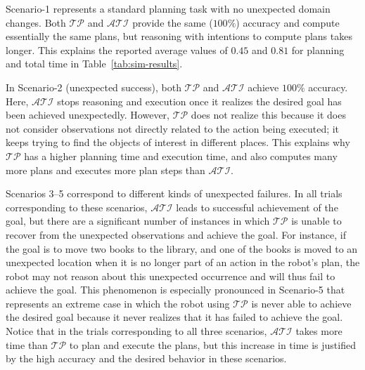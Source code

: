 \documentclass[letterpaper, 10 pt, conference]{ieeeconf}  %
\begin{document}
Scenario-1 represents a standard planning task with no unexpected
domain changes. Both $\mathcal{TP}$ and $\mathcal{ATI}$ provide the
same ($100\%$) accuracy and compute essentially the same plans, but
reasoning with intentions to compute plans takes longer. This explains
the reported average values of $0.45$ and $0.81$ for planning and
total time in Table~\ref{tab:sim-results}.

In Scenario-2 (unexpected success), both $\mathcal{TP}$ and
$\mathcal{ATI}$ achieve $100\%$ accuracy. Here, $\mathcal{ATI}$ stops
reasoning and execution once it realizes the desired goal has been
achieved unexpectedly. However, $\mathcal{TP}$ does not realize this
because it does not consider observations not directly related to the
action being executed; it keeps trying to find the objects of interest
in different places. This explains why $\mathcal{TP}$ has a higher
planning time and execution time, and also computes many more plans
and executes more plan steps than $\mathcal{ATI}$.

Scenarios 3--5 correspond to different kinds of unexpected failures.
In all trials corresponding to these scenarios, $\mathcal{ATI}$ leads
to successful achievement of the goal, but there are a significant
number of instances in which $\mathcal{TP}$ is unable to recover from
the unexpected observations and achieve the goal. For instance, if the
goal is to move two books to the library, and one of the books is
moved to an unexpected location when it is no longer part of an action
in the robot's plan, the robot may not reason about this unexpected
occurrence and will thus fail to achieve the goal. This phenomenon is
especially pronounced in Scenario-5 that represents an extreme case in
which the robot using $\mathcal{TP}$ is never able to achieve the
desired goal because it never realizes that it has failed to achieve
the goal. Notice that in the trials corresponding to all three
scenarios, $\mathcal{ATI}$ takes more time than $\mathcal{TP}$ to plan
and execute the plans, but this increase in time is justified by the
high accuracy and the desired behavior in these scenarios.
\end{document}
